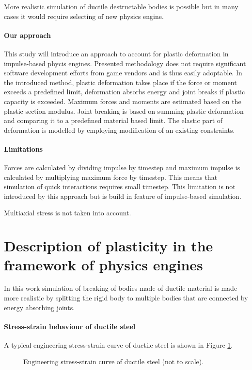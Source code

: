 \documentclass{jcgt}
\begin{document}
More realistic simulation of ductile destructable bodies is possible but in many cases it would require selecting of new physics engine.

\paragraph{Our approach}
This study will introduce an approach to account for plastic deformation in impulse-based phycis engines.   
Presented methodology does not require significant software development efforts from
game vendors and is thus easily adoptable. 
In the introduced method, plastic deformation takes place if the force or moment exceeds a predefined 
limit, deformation absorbs energy and joint breaks if plastic capacity is exceeded. 
Maximum forces and moments are estimated based on the plastic section modulus.
Joint breaking is based on summing plastic deformation and comparing it to a
predefined material based limit. The elastic part of deformation is modelled by employing 
modification of an existing constraints.

\paragraph{Limitations}
Forces are calculated by dividing impulse by timestep and maximum impulse is calculated
by multiplying maximum force by timestep. 
This means that simulation of quick interactions requires small timestep.
This limitation is not introduced by this approach but is build in feature of impulse-based simulation.

Multiaxial stress is not taken into account. 


\section{Description of plasticity in the framework of physics engines}

In this work simulation of breaking of bodies made of ductile material is made more realistic 
by splitting the rigid body
to multiple bodies that are connected by energy absorbing joints.

\paragraph{Stress-strain behaviour of ductile steel}
A typical engineering stress-strain curve of ductile steel is shown in Figure \ref{fig:sscurve}.

\begin{figure}
\centering
{}
\caption{Engineering stress-strain curve of ductile steel (not to scale).}
\label{fig:sscurve}
\end{figure}
\end{document}
